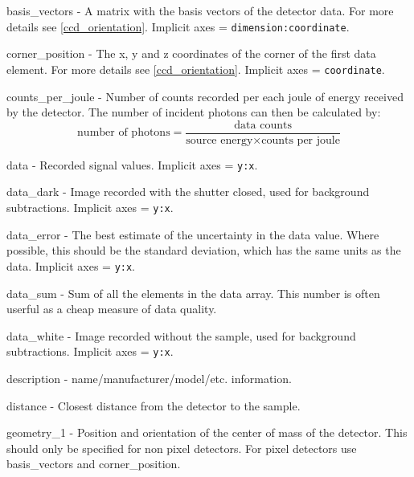 \documentclass[usletter,11pt]{article}
\newcommand{\member}[2]
{ \noindent
{ \color{softBlue}  #1 - } #2
\vspace{0.2cm}
}
\begin{document}
\member{basis\_vectors}{A matrix with the basis vectors of the
  detector data. For more details see \ref{ccd_orientation}. Implicit axes =
  {\tt dimension:coordinate}.
}

\member{corner\_position}{The x, y and z coordinates of the corner of
  the first data element. For more details see \ref{ccd_orientation}. Implicit
  axes = {\tt coordinate}.
}

\member{counts\_per\_joule}{Number of counts recorded per each joule of
  energy received by the detector. The number of incident photons can
  then be calculated by:
\begin{equation*}
\text{number of photons} = \frac{\text{data counts}}{\text{source energy} \times \text{counts per joule}}
\end{equation*}
}

\member{data}{Recorded signal values. Implicit axes = {\tt y:x}.}

\member{data\_dark}{Image recorded with the shutter closed, used for
 background subtractions. Implicit axes = {\tt y:x}.}

\member{data\_error}{The best estimate of the uncertainty in the data
value. Where possible, this should be the standard deviation, which
has the same units as the data. Implicit axes = {\tt y:x}.}

\member{data\_sum}{Sum of all the elements in the data array. This
  number is often userful as a cheap measure of data quality.}

\member{data\_white}{Image recorded without the sample, used for
 background subtractions. Implicit axes = {\tt y:x}.}

\member{description}{name/manufacturer/model/etc. information.}

\member{distance}{Closest distance from the detector to
the sample.}

\member{geometry\_1}{Position and orientation of the center of mass of
  the detector. This should only be specified for non pixel
  detectors. For pixel detectors use basis\_vectors and
  corner\_position.}
\end{document}
